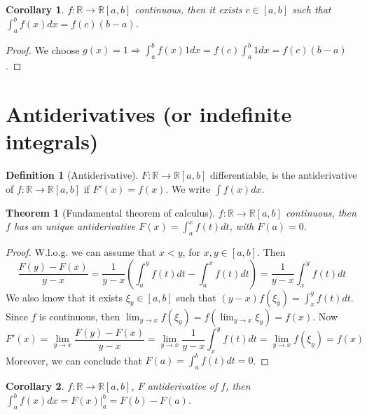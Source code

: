 \documentclass{article}
\newcommand{\DS}{\displaystyle}
\newcommand{\Ar}{\Rightarrow}
\newcommand{\fOnR}[1]{#1 : \mathbb{R} \rightarrow \mathbb{R}}
\newcommand{\intcc}[1]{\left[#1\right]}
\theoremstyle{definition}
\newtheorem{definition}{Definition}[section]
\theoremstyle{definition}
\theoremstyle{plain}
\newtheorem{theorem}{Theorem}[section]
\theoremstyle{plain}
\newtheorem{corollary}{Corollary}[theorem]
\theoremstyle{plain}
\theoremstyle{plain}
\theoremstyle{definition}
\theoremstyle{remark}
\theoremstyle{remark}
\theoremstyle{remark}
\theoremstyle{remark}
\begin{document}
\begin{corollary}
  $\fOnR{f}{\intcc{a,b}}$ continuous, then it exists $c \in \intcc{a,b}$ such that $\int_a^b f(x) dx = f(c) (b-a)$.
\end{corollary}

\begin{proof}
  We choose $g(x) = 1 \Ar \int_a^b f(x) 1 dx = f(c) \int_a^b 1 dx = f(c) (b-a)$.
\end{proof}


\section{Antiderivatives (or indefinite integrals)}


\begin{definition}[Antiderivative]
  $\fOnR{F}{\intcc{a,b}}$ differentiable, is the antiderivative of $\fOnR{f}{\intcc{a,b}}$ if $F'(x) = f(x)$. We write $\int f(x) dx$.
\end{definition}


\begin{theorem}[Fundamental theorem of calculus]
  $\fOnR{f}{\intcc{a,b}}$ continuous, then $f$ has an unique antiderivative $F(x) = \int_a^x f(t) dt$, with $F(a) = 0$.
\end{theorem}

\begin{proof}
  W.l.o.g. we can assume that $x < y$, for $x,y \in \intcc{a,b}$. Then
  \[
    \frac{F(y)-F(x)}{y-x} =
    \frac{1}{y-x}\left(\int_a^y f(t) dt - \int_a^x f(t) dt\right) =
    \frac{1}{y-x} \int_x^y f(t) dt
  \]
  We also know that it exists $\xi_y \in \intcc{a,b}$ such that $(y-x) f(\xi_y) = \int_x^y f(t) dt$. Since $f$ is continuous, then $\DS \lim_{y \to x} f(\xi_y) = f(\lim_{y \to x} \xi_y) = f(x)$. Now
  \[
    F'(x) =
    \lim_{y \to x} \frac{F(y)-F(x)}{y-x} =
    \lim_{y \to x} \frac{1}{y-x} \int_x^y f(t) dt =
    \lim_{y \to x} f(\xi_y) =
    f(x)
  \]
  Moreover, we can conclude that $F(a) = \int_a^b f(t) dt = 0$.
\end{proof}

\begin{corollary}
  $\fOnR{f}{\intcc{a,b}}$, $F$ antiderivative of $f$, then $\int_a^b f(x) dx = F(x) |_a^b = F(b) - F(a)$.
\end{corollary}
\end{document}
